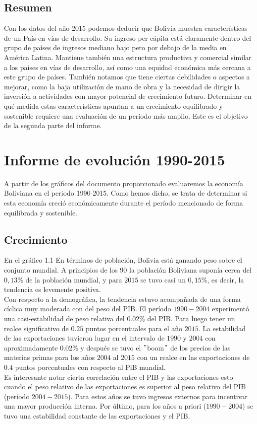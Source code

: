     \subsection{Resumen}
    Con los datos del año 2015 podemos deducir que Bolivia muestra características de un País en vías de desarrollo. Su ingreso per cápita está claramente dentro del grupo de países de ingresos mediano bajo pero por debajo de la media en América Latina. Mantiene también una estructura productiva y comercial similar a los países en vías de desarrollo, así como una equidad económica más cercana a este grupo de países. También notamos que tiene ciertas debilidades o aspectos a mejorar, como la baja utilización de mano de obra y la necesidad de dirigir la inversión a actividades con mayor potencial de crecimiento futuro. Determinar en qué medida estas características apuntan a un crecimiento equilibrado y sostenible requiere una evaluación de un período más amplio. Este es el objetivo de la segunda parte del informe.

\section{Informe de evolución 1990-2015}
A partir de los gráficos del documento proporcionado evaluaremos la economía Boliviana en el periodo 1990-2015. Como hemos dicho, se trata de determinar si esta economía creció económicamente durante el período mencionado de forma equilibrada y sostenible.

    \subsection{Crecimiento}
    En el gráfico 1.1  En términos de población, Bolivia está ganando peso sobre el conjunto mundial. A principios de los $90$ la población Boliviana suponía cerca del $0,13 \%$ de la población mundial, y para $2015$ se tuvo casi un $0,15 \%$, es decir, la tendencia es levemente positiva.\\
    Con respecto a la demográfica, la tendencia  estuvo acompañada de una forma cíclica muy moderada con del peso del PIB. El período $1990-2004$ experimentó una casi-estabilidad de peso relativa del $0.02 \%$ del PIB. Para luego tener un realce significativo de $0.25$ puntos porcentuales para el año $2015$. La estabilidad de las exportaciones tuvieron lugar en el intervalo de $1990$ y $2004$ con aproximadamente $0.02\%$ y después se tuvo el $"$boom$"$ de los precios de las materias primas para los años $2004$ al $2015$ con un realce en las exportaciones de $0.4$ puntos porcentuales con respecto al PiB mundial.\\
    Es interesante notar cierta correlación entre el PIB y las exportaciones esto cuando el peso relativo de las exportaciones es superior al peso relativo del PIB (período $2004-2015$). Para estos años se tuvo ingresos externos para incentivar una mayor producción interna. Por último, para los años a priori ($1990-2004$) se tuvo una estabilidad constante de las exportaciones y el PIB.\\

